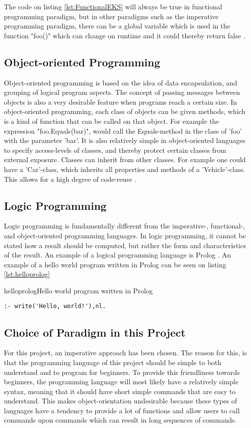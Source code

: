 The code on listing \ref{lst:FunctionalEKS} will always be true in functional programming paradigm, but in other paradigms such as the imperative programming paradigm, there can be a global variable which is used in the function "foo()" which can change on runtime and it could thereby return false \citep{ProgrammingParadigms}.
\subsection{Object-oriented Programming}
Object-oriented programming is based on the idea of data encapsulation, and grouping of logical program aspects. The concept of passing messages between objects is also a very desirable feature when programs reach a certain size. In object-oriented programming, each class of objects can be given methods, which is a kind of function that can be called on that object. For example the expression "foo.Equals(bar)", would call the Equals-method in the class of 'foo' with the parameter 'bar'. It is also relatively simple in object-oriented languages to specify access-levels of classes, and thereby protect certain classes from external exposure. Classes can inherit from other classes. For example one could have a 'Car'-class, which inherits all properties and methods of a 'Vehicle'-class. This allows for a high degree of code-reuse \citep{ProgrammingParadigms}.

\subsection{Logic Programming}
Logic programming is fundamentally different from the imperative-, functional-, and object-oriented programming languages. In logic programming, it cannot be stated how a result should be computed, but rather the form and characteristics of the result. An example of a logical programming language is Prolog  \citep{ProgrammingParadigms}. An example of a hello world program written in Prolog can be seen on listing \ref{lst:helloprolog}

\begin{code}{helloprolog}{Hello world program written in Prolog}
\begin{lstlisting}
:- write('Hello, world!'),nl.
\end{lstlisting}
\end{code}

\subsection{Choice of Paradigm in this Project}
For this project, an imperative approach has been chosen. The reason for this, is that the programming language of this project should be simple to both understand and to program for beginners. To provide this friendliness towards beginners, the programming language will most likely have a relatively simple syntax, meaning that it should have short simple commands that are easy to understand. This makes object-orientation undesirable because these types of languages have a tendency to provide a lot of functions and allow users to call commands upon commands which can result in long sequences of commands.